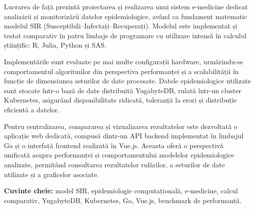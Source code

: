 
Lucrarea de față prezintă proiectarea și realizarea unui sistem e-medicine dedicat
analizării și monitorizării datelor epidemiologice, având ca fundament matematic
modelul SIR (Susceptibili--Infectați--Recuperați). Modelul este implementat și testat
comparativ în patru limbaje de programare cu utilizare intensă în calculul științific:
R, Julia, Python și SAS.

Implementările sunt evaluate pe mai multe configurații hardware, urmărindu-se
comportamentul algoritmilor din perspectiva performanței și a scalabilității în funcție
de dimensiunea seturilor de date procesate. Datele epidemiologice utilizate sunt stocate
într-o bază de date distribuită YugabyteDB, rulată într-un cluster Kubernetes, asigurând
disponibilitate ridicată, toleranță la erori și distribuție eficientă a datelor.

Pentru centralizarea, compararea și vizualizarea rezultatelor este dezvoltată o aplicație
web dedicată, compusă dintr-un API backend implementat în limbajul Go și o interfață
frontend realizată în Vue.js. Aceasta oferă o perspectivă unificată asupra performanței
și comportamentului modelelor epidemiologice analizate, permițând consultarea
rezultatelor rulărilor, a seturilor de date utilizate și a graficelor asociate.

\bigskip
\noindent\textbf{Cuvinte cheie:} model SIR, epidemiologie computațională, e-medicine,
calcul comparativ, YugabyteDB, Kubernetes, Go, Vue.js, benchmark de performanță.
